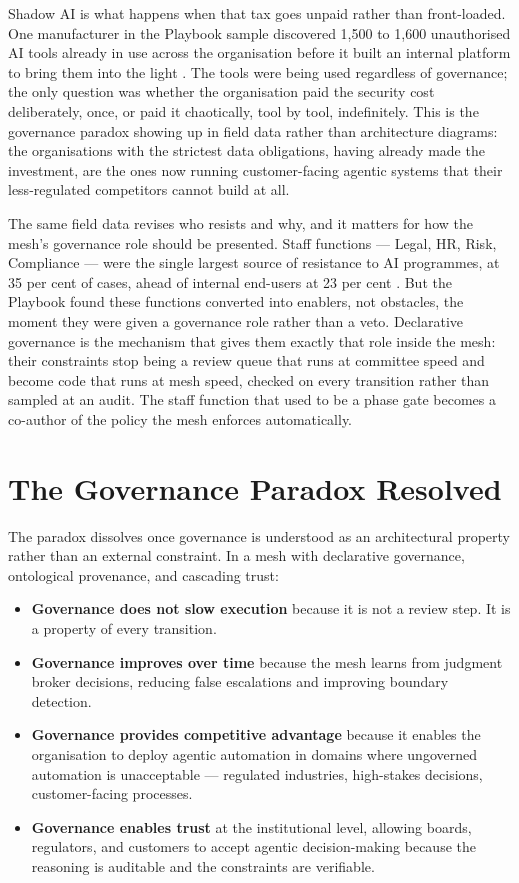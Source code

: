 Shadow AI is what happens when that tax goes unpaid rather than front-loaded. One manufacturer in the Playbook sample discovered 1,500 to 1,600 unauthorised AI tools already in use across the organisation before it built an internal platform to bring them into the light \parencite{Pereira2026Playbook}. The tools were being used regardless of governance; the only question was whether the organisation paid the security cost deliberately, once, or paid it chaotically, tool by tool, indefinitely. This is the governance paradox showing up in field data rather than architecture diagrams: the organisations with the strictest data obligations, having already made the investment, are the ones now running customer-facing agentic systems that their less-regulated competitors cannot build at all.

The same field data revises who resists and why, and it matters for how the mesh's governance role should be presented. Staff functions --- Legal, HR, Risk, Compliance --- were the single largest source of resistance to AI programmes, at 35 per cent of cases, ahead of internal end-users at 23 per cent \parencite{Pereira2026Playbook}. But the Playbook found these functions converted into enablers, not obstacles, the moment they were given a governance role rather than a veto. Declarative governance is the mechanism that gives them exactly that role inside the mesh: their constraints stop being a review queue that runs at committee speed and become code that runs at mesh speed, checked on every transition rather than sampled at an audit. The staff function that used to be a phase gate becomes a co-author of the policy the mesh enforces automatically.

\section{The Governance Paradox Resolved}

The paradox dissolves once governance is understood as an architectural property rather than an external constraint. In a mesh with declarative governance, ontological provenance, and cascading trust:

\begin{itemize}
  \item \textbf{Governance does not slow execution} because it is not a review step. It is a property of every transition.
  \item \textbf{Governance improves over time} because the mesh learns from judgment broker decisions, reducing false escalations and improving boundary detection.
  \item \textbf{Governance provides competitive advantage} because it enables the organisation to deploy agentic automation in domains where ungoverned automation is unacceptable --- regulated industries, high-stakes decisions, customer-facing processes.
  \item \textbf{Governance enables trust} at the institutional level, allowing boards, regulators, and customers to accept agentic decision-making because the reasoning is auditable and the constraints are verifiable.
\end{itemize}

